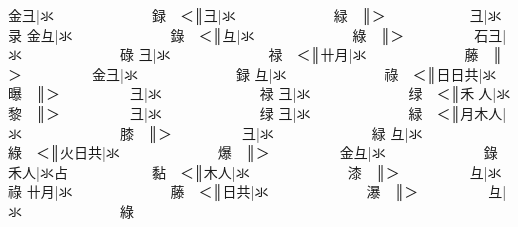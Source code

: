 {\cjk{}{\cnsym{}　　　　}金彐}|{\cjk{}氺{\cnsym{}　　　　　　　}録{\cnsym{}　}＜}║{\cjk{}{\cnsym{}　　　　　}彐}|{\cjk{}氺{\cnsym{}　　　　　　　}緑{\cnsym{}　}}║{\cjk{}＞{\cnsym{}　　　　　　}彐}|{\cjk{}氺{\cnsym{}　　　　　　　}录} 
{\cjk{}{\cnsym{}　　　　}金彑}|{\cjk{}氺{\cnsym{}　　　　　　　}錄{\cnsym{}　}＜}║{\cjk{}{\cnsym{}　　　　　}彑}|{\cjk{}氺{\cnsym{}　　　　　　　}綠{\cnsym{}　}}║{\cjk{}＞{\cnsym{}　　　　　}石彐}|{\cjk{}氺{\cnsym{}　　　　　　　}碌} 
{\cjk{}{\cnsym{}　　　　}彐}|{\cjk{}氺{\cnsym{}　　　　　　　}禄{\cnsym{}　}＜}║{\cjk{}{\cnsym{}　　　　}卄月}|{\cjk{}氺{\cnsym{}　　　　　　　}藤{\cnsym{}　}}║{\cjk{}＞{\cnsym{}　　　　　}金彐}|{\cjk{}氺{\cnsym{}　　　　　　　}録} 
{\cjk{}{\cnsym{}　　　　}彑}|{\cjk{}氺{\cnsym{}　　　　　　　}祿{\cnsym{}　}＜}║{\cjk{}{\cnsym{}　　　　}日日共}|{\cjk{}氺{\cnsym{}　　　　　　　}曝{\cnsym{}　}}║{\cjk{}＞{\cnsym{}　　　　　}彐}|{\cjk{}氺{\cnsym{}　　　　　　　}禄} 
{\cjk{}{\cnsym{}　　　　}彐}|{\cjk{}氺{\cnsym{}　　　　　　　}绿{\cnsym{}　}＜}║{\cjk{}{\cnsym{}　　　　}禾{\cnjzr{}}人}|{\cjk{}氺{\cnsym{}　　　　　　　}黎{\cnsym{}　}}║{\cjk{}＞{\cnsym{}　　　　　}彐}|{\cjk{}氺{\cnsym{}　　　　　　　}绿} 
{\cjk{}{\cnsym{}　　　　}彐}|{\cjk{}氺{\cnsym{}　　　　　　　}緑{\cnsym{}　}＜}║{\cjk{}{\cnsym{}　　　　}月木人}|{\cjk{}氺{\cnsym{}　　　　　　　}膝{\cnsym{}　}}║{\cjk{}＞{\cnsym{}　　　　　}彐}|{\cjk{}氺{\cnsym{}　　　　　　　}緑} 
{\cjk{}{\cnsym{}　　　　}彑}|{\cjk{}氺{\cnsym{}　　　　　　　}綠{\cnsym{}　}＜}║{\cjk{}{\cnsym{}　　　　}火日共}|{\cjk{}氺{\cnsym{}　　　　　　　}爆{\cnsym{}　}}║{\cjk{}＞{\cnsym{}　　　　　}金彑}|{\cjk{}氺{\cnsym{}　　　　　　　}錄} 
{\cjk{}{\cnsym{}　　　　}禾人}|{\cjk{}氺占{\cnsym{}　　　　　　}黏{\cnsym{}　}＜}║{\cjk{}{\cnsym{}　　　　}木人}|{\cjk{}氺{\cnsym{}　　　　　　　}漆{\cnsym{}　}}║{\cjk{}＞{\cnsym{}　　　　　}彑}|{\cjk{}氺{\cnsym{}　　　　　　　}祿} 
{\cjk{}{\cnsym{}　　　}卄月}|{\cjk{}氺{\cnsym{}　　　　　　　}藤{\cnsym{}　}＜}║{\cjk{}{\cnsym{}　　　　}日共}|{\cjk{}氺{\cnsym{}　　　　　　　}瀑{\cnsym{}　}}║{\cjk{}＞{\cnsym{}　　　　　}彑}|{\cjk{}氺{\cnsym{}　　　　　　　}綠} 
